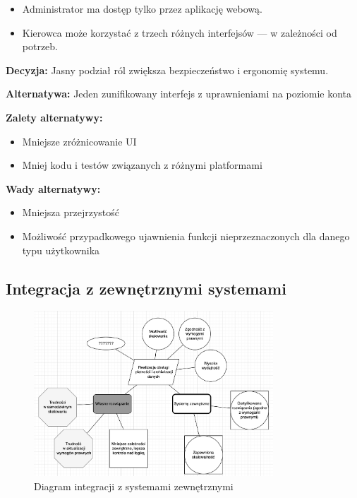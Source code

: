\documentclass[12pt]{article}
\begin{document}
\begin{itemize}
\item Administrator ma dostęp tylko przez aplikację webową.
\item Kierowca może korzystać z trzech różnych interfejsów — w zależności od potrzeb.
\end{itemize}

\textbf{Decyzja:} Jasny podział ról zwiększa bezpieczeństwo i ergonomię systemu.

\textbf{Alternatywa:} Jeden zunifikowany interfejs z uprawnieniami na poziomie konta

\textbf{Zalety alternatywy:}
\begin{itemize}
\item Mniejsze zróżnicowanie UI
\item Mniej kodu i testów związanych z różnymi platformami
\end{itemize}

\textbf{Wady alternatywy:}
\begin{itemize}
\item Mniejsza przejrzystość
\item Możliwość przypadkowego ujawnienia funkcji nieprzeznaczonych dla danego typu użytkownika
\end{itemize}

\subsection{Integracja z zewnętrznymi systemami}
\begin{figure}[h]
\centering
\includegraphics[width=0.8\textwidth]{realizacja_obslugi_platnosci_i_archiwizacji_danych.png}
\caption{Diagram integracji z systemami zewnętrznymi}
\label{fig:integration}
\end{figure}
\end{document}
